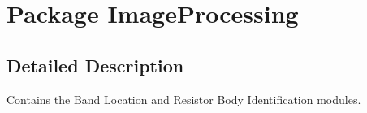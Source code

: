 \hypertarget{namespace_image_processing}{}\section{Package Image\+Processing}
\label{namespace_image_processing}


\subsection{Detailed Description}
Contains the Band Location and Resistor Body Identification modules. 